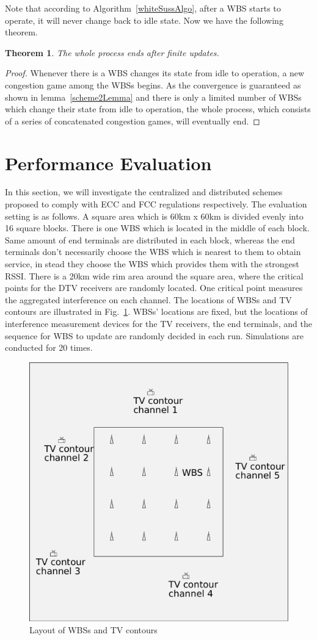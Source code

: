 \documentclass[times]{ettauth}
\theoremstyle{mytheoremstyle}
\newtheorem{theorem}{Theorem}[section]
\theoremstyle{mytheoremstyle}
\theoremstyle{mytheoremstyle}
\begin{document}
Note that according to Algorithm~\ref{whiteSussAlgo}, after a WBS starts to operate, it will never change back to idle state.
Now we have the following theorem.
\begin{theorem}
The whole process ends after finite updates.
\end{theorem}

\begin{proof}
Whenever there is a WBS changes its state from idle to operation, a new congestion game among the WBSs begins.
As the convergence is guaranteed as shown in lemma~\ref{scheme2Lemma} and there is only a limited number of WBSs which change their state from idle to operation, the whole process, which consists of a series of concatenated congestion games, will eventually end.
\end{proof}


	
	



\section{Performance Evaluation}
\label{simulation}
In this section, we will investigate the centralized and distributed schemes proposed to comply with ECC and FCC regulations respectively.
The evaluation setting is as follows.
A square area which is 60km x 60km is divided evenly into 16 square blocks.
There is one WBS which is located in the middle of each block.
Same amount of end terminals are distributed in each block, whereas the end terminals don't necessarily choose the WBS which is nearest to them to obtain service, in stead they choose the WBS which provides them with the strongest RSSI.
There is a 20km wide rim area around the square area, where the critical points for the DTV receivers are randomly located.
One critical point measures the aggregated interference on each channel.
The locations of WBSs and TV contours are illustrated in Fig.~\ref{sim:layout}.
WBSs' locations are fixed, but the locations of interference measurement devices for the TV receivers, the end terminals, and the sequence for WBS to update are randomly decided in each run.
Simulations are conducted for 20 times.

\begin{figure}[h!]
  \centering
  \includegraphics[width=0.5\linewidth]{layout.pdf}
  \caption{Layout of WBSs and TV contours}
  \label{sim:layout}
\end{figure}
\end{document}
